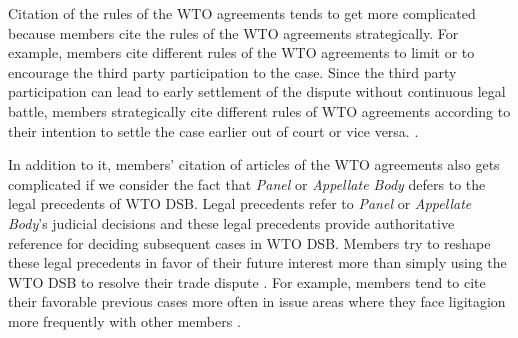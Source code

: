 
Citation of the rules of the WTO agreements tends to get more complicated because members cite the
rules of the WTO agreements strategically. For example,
members cite different rules of the WTO agreements to limit or to encourage
the third party participation to the case. Since the third party participation
can lead to early settlement of the dispute without continuous
legal battle, members strategically cite different rules of WTO agreements according to their intention to
settle the case earlier out of court or vice versa.
\citep{who_gets}.

In addition to it, members' citation of articles of the WTO agreements also gets complicated
if we consider the fact that \textit{Panel} or \textit{Appellate Body} defers to the legal precedents of WTO DSB.
Legal precedents refer to \textit{Panel} or \textit{Appellate Body}'s judicial decisions
and these legal precedents provide authoritative reference
for deciding subsequent cases in WTO DSB.
Members try to reshape these legal precedents
in favor of their future interest more than
simply using the WTO DSB to resolve their trade
dispute \citep{pelc}. For example,
members tend to cite their
favorable previous cases more often in issue areas where they face ligitagion more frequently with other members
\citep{latent}.


